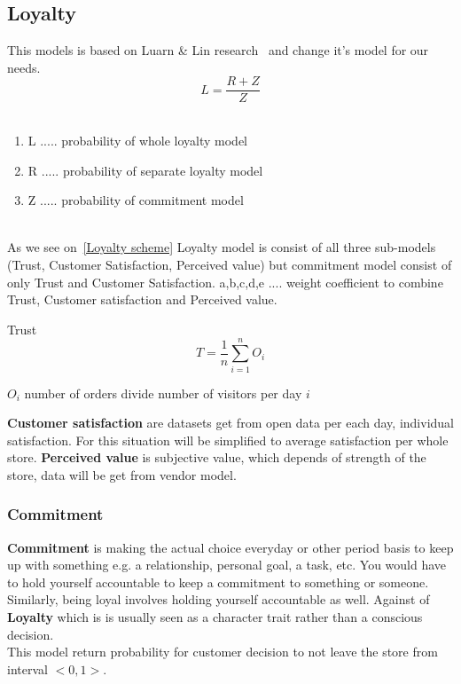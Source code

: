 \subsection{Loyalty} \label{subsec:model_loyalty}
This models is based on Luarn & Lin research~\cite{luarn} and change it's model for our needs.
\begin{equation} \label{eq:30}
L = \frac{R+Z}{Z}
\end{equation}
\\
\begin{enumerate}
    \item L ..... probability of whole loyalty model
    \item R ..... probability of separate loyalty model
    \item Z ..... probability of commitment model
\end{enumerate}
\\
As we see on~\ref{Loyalty scheme} Loyalty model is consist of all three sub-models (Trust, Customer Satisfaction, Perceived value)
but commitment model consist of only Trust and Customer Satisfaction.
a,b,c,d,e .... weight coefficient to combine Trust, Customer satisfaction and Perceived value.

Trust
\begin{equation} \label{eq:31}
T = \frac{1}{n} \sum_{i=1}^{n} O_i
\end{equation}

$O_i$ number of orders divide number of visitors per day $i$

\textbf{Customer satisfaction} are datasets get from open data per each day, individual satisfaction.
For this situation will be simplified to average satisfaction per whole store.
\textbf{Perceived value} is subjective value, which depends of strength of the store, data will be get from vendor model.
\subsubsection{Commitment} \label{subsubsec:model_loyalty_commitment}
\textbf{Commitment} is making the actual choice everyday or other period basis to keep up with something e.g. a relationship, personal goal, a task, etc.
You would have to hold yourself accountable to keep a commitment to something or someone.
Similarly, being loyal involves holding yourself accountable as well.
Against of \textbf{Loyalty} which is is usually seen as a character trait rather than a conscious decision.\\
This model return probability for customer decision to not leave the store from interval $<0,1>$.

